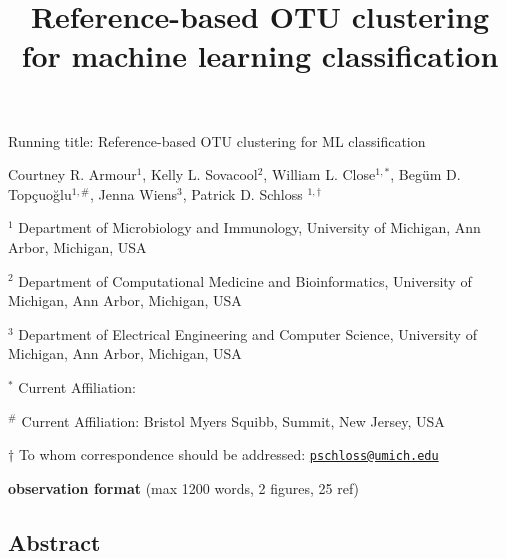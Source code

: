 \documentclass[
]{article}
\title{\textbf{Reference-based OTU clustering for machine learning
classification}}
\author{}
\date{\vspace{-2.5em}}
\begin{document}
\maketitle

\vspace{5mm}

Running title: Reference-based OTU clustering for ML classification

\vspace{10mm}

Courtney R. Armour\({^1}\), Kelly L. Sovacool\({^2}\), William L.
Close\(^{1,*}\), Begüm D. Topçuoğlu\(^{1,\#}\), Jenna Wiens\({^3}\),
Patrick D. Schloss \(^{1,\dagger}\)

\vspace{10mm}

\({^1}\) Department of Microbiology and Immunology, University of
Michigan, Ann Arbor, Michigan, USA

\({^2}\) Department of Computational Medicine and Bioinformatics,
University of Michigan, Ann Arbor, Michigan, USA

\({^3}\) Department of Electrical Engineering and Computer Science,
University of Michigan, Ann Arbor, Michigan, USA

\({^*}\) Current Affiliation:

\({^\#}\) Current Affiliation: Bristol Myers Squibb, Summit, New Jersey,
USA~

\(\dagger\) To whom correspondence should be addressed:
\href{mailto:pschloss@umich.edu}{\nolinkurl{pschloss@umich.edu}}

\vspace{10mm}

\textbf{observation format} (max 1200 words, 2 figures, 25 ref)

\newpage

\linenumbers

\hypertarget{abstract}{%
\subsection{Abstract}\label{abstract}}
\end{document}
